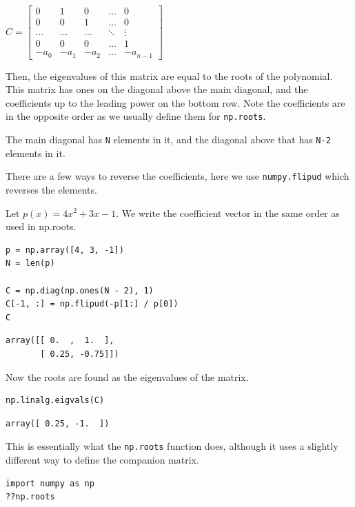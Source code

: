 \documentclass[11pt]{article}
\begin{document}
\(C = \left[\begin{array}{ccccc}
  0 & 1 & 0 & ... & 0\\
  0 & 0 & 1 & ... & 0\\
  ... & ... & ... & \ddots & \vdots \\
  0 & 0 & 0 & ... & 1\\
  -a_0 & -a_1 & -a_2 & ... & -a_{n-1}
  \end{array}\right]\)

Then, the eigenvalues of this matrix are equal to the roots of the polynomial. This matrix has ones on the diagonal above the main diagonal, and the coefficients up to the leading power on the bottom row. Note the coefficients are in the opposite order as we usually define them for \texttt{np.roots}.

The main diagonal has \texttt{N} elements in it, and the diagonal above that has \texttt{N-2} elements in it.

There are a few ways to reverse the coefficients, here we use \texttt{numpy.flipud} which reverses the elements.

Let \(p(x) = 4 x^2 + 3x - 1\). We write the coefficient vector in the same order as used in np.roots.

\begin{verbatim}
p = np.array([4, 3, -1])
N = len(p)

C = np.diag(np.ones(N - 2), 1)
C[-1, :] = np.flipud(-p[1:] / p[0])
C
\end{verbatim}

\begin{verbatim}
array([[ 0.  ,  1.  ],
       [ 0.25, -0.75]])
\end{verbatim}

Now the roots are found as the eigenvalues of the matrix.

\begin{verbatim}
np.linalg.eigvals(C)
\end{verbatim}

\begin{verbatim}
array([ 0.25, -1.  ])
\end{verbatim}


This is essentially what the \texttt{np.roots} function does, although it uses a slightly different way to define the companion matrix.

\begin{verbatim}
import numpy as np
??np.roots
\end{verbatim}
\end{document}
